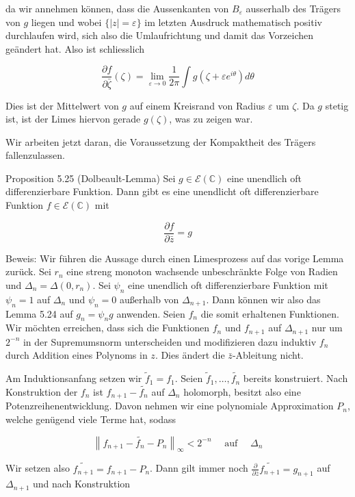 \documentclass[10pt, letterpaper]{article}
\begin{document}
da wir annehmen können, dass die Aussenkanten von $B_{\varepsilon}$ ausserhalb des Trägers von $g$ liegen und wobei $\{|z|=\varepsilon\}$ im letzten Ausdruck mathematisch positiv durchlaufen wird, sich also die Umlaufrichtung und damit das Vorzeichen\\
geändert hat. Also ist schliesslich

$$
\frac{\partial f}{\partial \bar{\zeta}}(\zeta)=\lim _{\varepsilon \rightarrow 0} \frac{1}{2 \pi} \int g\left(\zeta+\varepsilon e^{i \theta}\right) d \theta
$$

Dies ist der Mittelwert von $g$ auf einem Kreisrand von Radius $\varepsilon$ um $\zeta$. Da $g$ stetig ist, ist der Limes hiervon gerade $g(\zeta)$, was zu zeigen war.

Wir arbeiten jetzt daran, die Voraussetzung der Kompaktheit des Trägers fallenzulassen.

Proposition 5.25 (Dolbeault-Lemma) Sei $g \in \mathcal{E}(\mathbb{C})$ eine unendlich oft differenzierbare Funktion. Dann gibt es eine unendlicht oft differenzierbare Funktion $f \in \mathcal{E}(\mathbb{C})$ mit

$$
\frac{\partial f}{\partial \bar{z}}=g
$$

Beweis: Wir führen die Aussage durch einen Limesprozess auf das vorige Lemma zurück. Sei $r_{n}$ eine streng monoton wachsende unbeschränkte Folge von Radien und $\Delta_{n}=\Delta\left(0, r_{n}\right)$. Sei $\psi_{n}$ eine unendlich oft differenzierbare Funktion mit $\psi_{n}=1$ auf $\Delta_{n}$ und $\psi_{n}=0$ außerhalb von $\Delta_{n+1}$. Dann können wir also das Lemma 5.24 auf $g_{n}=\psi_{n} g$ anwenden. Seien $f_{n}$ die somit erhaltenen Funktionen. Wir möchten erreichen, dass sich die Funktionen $f_{n}$ und $f_{n+1}$ auf $\Delta_{n+1}$ nur um $2^{-n}$ in der Supremumsnorm unterscheiden und modifizieren dazu induktiv $f_{n}$ durch Addition eines Polynoms in $z$. Dies ändert die $\bar{z}$-Ableitung nicht.

Am Induktionsanfang setzen wir $\widetilde{f}_{1}=f_{1}$. Seien $\widetilde{f}_{1}, \ldots, \widetilde{f_{n}}$ bereits konstruiert. Nach Konstruktion der $f_{n}$ ist $f_{n+1}-\widetilde{f_{n}}$ auf $\Delta_{n}$ holomorph, besitzt also eine Potenzreihenentwicklung. Davon nehmen wir eine polynomiale Approximation $P_{n}$, welche genügend viele Terme hat, sodass

$$
\left\|f_{n+1}-\widetilde{f_{n}}-P_{n}\right\|_{\infty}<2^{-n} \quad \text { auf } \quad \Delta_{n}
$$

Wir setzen also $\widetilde{f_{n+1}}=f_{n+1}-P_{n}$. Dann gilt immer noch $\frac{\partial}{\partial \bar{z}} \widetilde{f_{n+1}}=g_{n+1}$ auf $\Delta_{n+1}$ und nach Konstruktion
\end{document}
